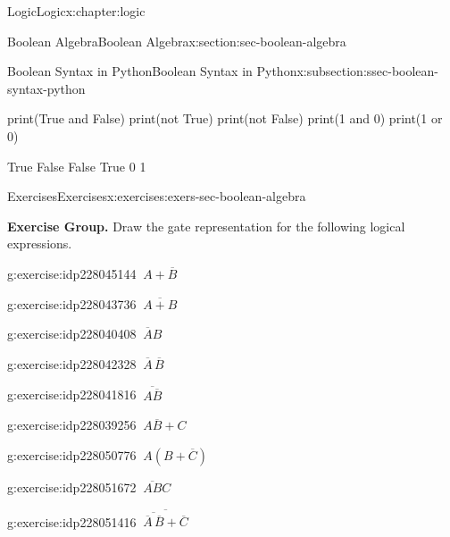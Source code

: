 \documentclass[twoside,10pt,]{book}
\numberwithin{equation}{section}
\begin{document}
\begin{chapterptx}{Logic}{}{Logic}{}{}{x:chapter:logic}
\begin{sectionptx}{Boolean Algebra}{}{Boolean Algebra}{}{}{x:section:sec-boolean-algebra}
\begin{subsectionptx}{Boolean Syntax in Python}{}{Boolean Syntax in Python}{}{}{x:subsection:ssec-boolean-syntax-python}
\begin{sageinput}
print(True and False)
print(not True)
print(not False)
print(1 and 0)
print(1 or 0)
\end{sageinput}
\begin{sageoutput}
True
False
False
True
0
1
\end{sageoutput}
%
\end{subsectionptx}
%
%
\typeout{************************************************}
\typeout{************************************************}
%
\begin{exercises-subsection}{Exercises}{}{Exercises}{}{}{x:exercises:exers-sec-boolean-algebra}
\par\medskip\noindent%
\textbf{Exercise Group.}\space\space%
Draw the gate representation for the following logical expressions.\begin{exercisegroup}
\begin{divisionexerciseeg}{1}{}{}{g:exercise:idp228045144}%
\(\ A+\overline{B}\)\end{divisionexerciseeg}%
\begin{divisionexerciseeg}{2}{}{}{g:exercise:idp228043736}%
\(\ \overline{A+B}\)\end{divisionexerciseeg}%
\begin{divisionexerciseeg}{3}{}{}{g:exercise:idp228040408}%
\(\ \overline{A}{}B\)\end{divisionexerciseeg}%
\begin{divisionexerciseeg}{4}{}{}{g:exercise:idp228042328}%
\(\ \overline{A}\,\overline{B}\)\end{divisionexerciseeg}%
\begin{divisionexerciseeg}{5}{}{}{g:exercise:idp228041816}%
\(\ \overline{A\overline{B}}\)\end{divisionexerciseeg}%
\begin{divisionexerciseeg}{6}{}{}{g:exercise:idp228039256}%
\(\ A\overline{B}+C\)\end{divisionexerciseeg}%
\begin{divisionexerciseeg}{7}{}{}{g:exercise:idp228050776}%
\(\ A(B+\overline{C})\)\end{divisionexerciseeg}%
\begin{divisionexerciseeg}{8}{}{}{g:exercise:idp228051672}%
\(\ \overline{AB}C\)\end{divisionexerciseeg}%
\begin{divisionexerciseeg}{9}{}{}{g:exercise:idp228051416}%
\(\ \overline{\overline{\overline{A}\,\overline{B}}+\overline{C}}\)\end{divisionexerciseeg}%

\end{exercisegroup}
\end{exercises-subsection}
\end{sectionptx}
\end{chapterptx}
\end{document}
